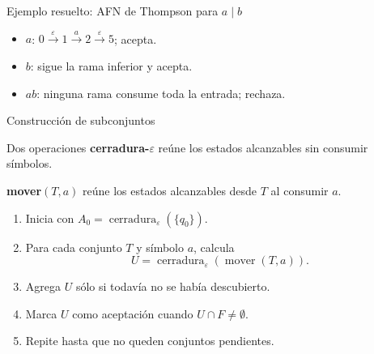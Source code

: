 \documentclass[11pt,spanish]{beamer}
\newcommand{\term}[1]{\textbf{\textcolor{indiagreen!80!black}{#1}}}
\begin{document}
\begin{frame}{Ejemplo resuelto: AFN de Thompson para \(a\mid b\)}
\vfill

\begin{center}
\end{center}

\bigskip
\begin{itemize}
\item \(a\): \(0\xrightarrow{\varepsilon}1\xrightarrow{a}2\xrightarrow{\varepsilon}5\); acepta.
\item \(b\): sigue la rama inferior y acepta.
\item \(ab\): ninguna rama consume toda la entrada; rechaza.
\end{itemize}

\vfill
\end{frame}

\begin{frame}{Construcción de subconjuntos}
\vfill

\begin{block}{Dos operaciones}
\small
\term{cerradura-\(\varepsilon\)} reúne los estados alcanzables sin consumir símbolos.\par
\term{mover\((T,a)\)} reúne los estados alcanzables desde \(T\) al consumir \(a\).
\end{block}

\bigskip
\begin{enumerate}
\item Inicia con \(A_0=\operatorname{cerradura}_{\varepsilon}(\{q_0\})\).
\item Para cada conjunto \(T\) y símbolo \(a\), calcula
\[
U=\operatorname{cerradura}_{\varepsilon}(\operatorname{mover}(T,a)).
\]
\item Agrega \(U\) sólo si todavía no se había descubierto.
\item Marca \(U\) como aceptación cuando \(U\cap F\neq\emptyset\).
\item Repite hasta que no queden conjuntos pendientes.
\end{enumerate}

\vfill
\end{frame}
\end{document}

